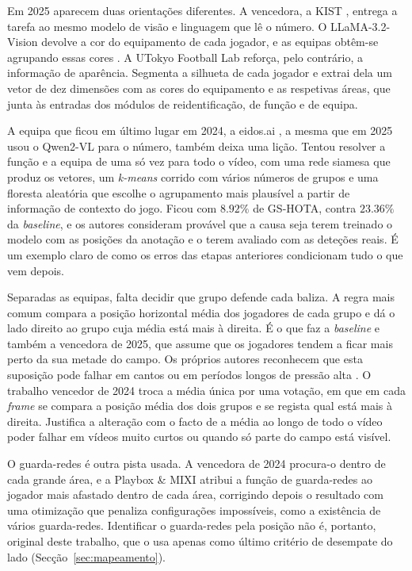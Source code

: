 Em 2025 aparecem duas orientações diferentes. A vencedora, a KIST \citep[equipa GSR-1]{giancola2025soccernet}, entrega a tarefa ao mesmo modelo de visão e linguagem que lê o número. O LLaMA-3.2-Vision devolve a cor do equipamento de cada jogador, e as equipas obtêm-se agrupando essas cores \citep{oo2026broadcast2pitch}. A UTokyo Football Lab \citep[equipa GSR-8]{giancola2025soccernet} reforça, pelo contrário, a informação de aparência. Segmenta a silhueta de cada jogador e extrai dela um vetor de dez dimensões com as cores do equipamento e as respetivas áreas, que junta às entradas dos módulos de reidentificação, de função e de equipa.

A equipa que ficou em último lugar em 2024, a eidos.ai \citep[equipa GSR-16]{cioppa2024soccernet}, a mesma que em 2025 usou o Qwen2-VL para o número, também deixa uma lição. Tentou resolver a função e a equipa de uma só vez para todo o vídeo, com uma rede siamesa que produz os vetores, um \emph{k-means} corrido com vários números de grupos e uma floresta aleatória que escolhe o agrupamento mais plausível a partir de informação de contexto do jogo. Ficou com $8{.}92\%$ de GS-HOTA, contra $23{.}36\%$ da \emph{baseline}, e os autores consideram provável que a causa seja terem treinado o modelo com as posições da anotação e o terem avaliado com as deteções reais. É um exemplo claro de como os erros das etapas anteriores condicionam tudo o que vem depois.

Separadas as equipas, falta decidir que grupo defende cada baliza. A regra mais comum compara a posição horizontal média dos jogadores de cada grupo e dá o lado direito ao grupo cuja média está mais à direita. É o que faz a \emph{baseline} e também a vencedora de 2025, que assume que os jogadores tendem a ficar mais perto da sua metade do campo. Os próprios autores reconhecem que esta suposição pode falhar em cantos ou em períodos longos de pressão alta \citep{oo2026broadcast2pitch}. O trabalho vencedor de 2024 troca a média única por uma votação, em que em cada \emph{frame} se compara a posição média dos dois grupos e se regista qual está mais à direita. Justifica a alteração com o facto de a média ao longo de todo o vídeo poder falhar em vídeos muito curtos ou quando só parte do campo está visível.

O guarda-redes é outra pista usada. A vencedora de 2024 procura-o dentro de cada grande área, e a Playbox \& MIXI \citep[equipa GSR-4]{giancola2025soccernet} atribui a função de guarda-redes ao jogador mais afastado dentro de cada área, corrigindo depois o resultado com uma otimização que penaliza configurações impossíveis, como a existência de vários guarda-redes. Identificar o guarda-redes pela posição não é, portanto, original deste trabalho, que o usa apenas como último critério de desempate do lado (Secção~\ref{sec:mapeamento}).

